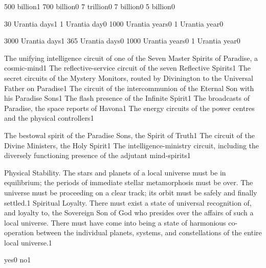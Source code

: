 {500 billion}{1}
{700 billion}{0}
{7 trillion}{0}
{7 billion}{0}
{5 billion}{0}
\qstop

{30 Urantia days}{1}
{1 Urantia day}{0}
{1000 Urantia years}{0}
{1 Urantia year}{0}
\qstop

{3000 Urantia days}{1}
{365 Urantia days}{0}
{1000 Urantia years}{0}
{1 Urantia year}{0}
\qstop

{The unifying intelligence circuit of one of the Seven Master Spirits of Paradise, a cosmic-mind}{1}
{The reflective-service circuit of the seven Reflective Spirits}{1}
{The secret circuits of the Mystery Monitors, routed by Divinington to the Universal Father on Paradise}{1}
{The circuit of the intercommunion of the Eternal Son with his Paradise Sons}{1}
{The flash presence of the Infinite Spirit}{1}
{The broadcasts of Paradise, the space reports of Havona}{1}
{The energy circuits of the power centres and the physical controllers}{1}
\qstop

{The bestowal spirit of the Paradise Sons, the Spirit of Truth}{1}
{The circuit of the Divine Ministers, the Holy Spirit}{1}
{The intelligence-ministry circuit, including the diversely functioning presence of the adjutant mind-spirits}{1}
\qstop

{Physical Stability. The stars and planets of a local universe must be in equilibrium; the periods of immediate stellar metamorphosis must be over. The universe must be proceeding on a clear track; its orbit must be safely and finally settled.}{1}
{Spiritual Loyalty. There must exist a state of universal recognition of, and loyalty to, the Sovereign Son of God who presides over the affairs of such a local universe. There must have come into being a state of harmonious co-operation between the individual planets, systems, and constellations of the entire local universe.}{1}
\qstop

{yes}{0}
{no}{1}
\qstop

